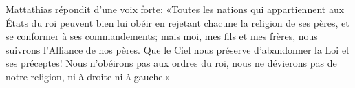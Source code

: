 Mattathias répondit d’une voix forte:
	«Toutes les nations qui appartiennent aux États du roi
		peuvent bien lui obéir en rejetant chacune la religion de ses pères,
	et se conformer à ses commandements;
	mais moi, mes fils et mes frères, nous suivrons l’Alliance de nos pères.
Que le Ciel nous préserve d’abandonner la Loi et ses préceptes!
	Nous n’obéirons pas aux ordres du roi,
	nous ne dévierons pas de notre religion, ni à droite ni à gauche.»
